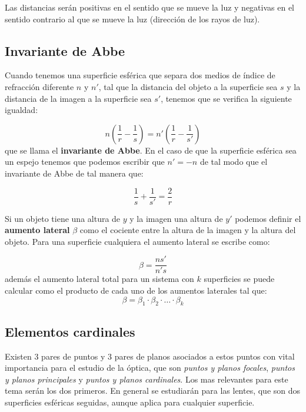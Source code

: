 \documentclass[12pt,a4paper]{article}
\newcommand{\parentesis}[1]{\left( #1  \right)}
\numberwithin{equation}{section}
\numberwithin{figure}{section}
\begin{document}
Las distancias serán positivas en el sentido que se mueve la luz y negativas en el sentido contrario al que se mueve la luz (dirección de los rayos de luz).

\subsection{Invariante de Abbe}

Cuando tenemos una superficie esférica que separa dos medios de índice de refracción diferente $n$ y $n'$, tal que la distancia del objeto a la superficie sea $s$ y la distancia de la imagen a la superficie sea $s'$, tenemos que se verifica la siguiente igualdad:

\begin{equation}
n \parentesis{\dfrac{1}{r}-\dfrac{1}{s}} = n' \parentesis{\dfrac{1}{r}-\dfrac{1}{s'}}
\end{equation}
que se llama el \textbf{invariante de Abbe}. En el caso de que la superficie esférica sea un espejo tenemos que podemos escribir que $n' = -n$ de tal modo que el invariante de Abbe de tal manera que:

\begin{equation}
\dfrac{1}{s} + \dfrac{1}{s'} = \dfrac{2}{r}
\end{equation} 

Si un objeto tiene una altura de $y$ y la imagen una altura de $y'$ podemos definir el \textbf{aumento lateral} $\beta$ como el cociente entre la altura de la imagen y la altura del objeto. Para una superficie cualquiera el aumento lateral se escribe como:

\begin{equation}
\beta = \dfrac{n s'}{n' s}
\end{equation}
además el aumento lateral total para un sistema con $k$ superficies se puede calcular como el producto de cada uno de los aumentos laterales tal que:
\begin{equation}
\beta = \beta_1 \cdot \beta_2 \cdot \ldots \cdot \beta_k
\end{equation}



\subsection{Elementos cardinales}

Existen 3 pares de puntos y 3 pares de planos asociados a estos puntos con vital importancia para el estudio de la óptica, que son \textit{puntos y planos focales}, \textit{puntos y planos principales} y \textit{puntos y planos cardinales}. Los mas relevantes para este tema serán los dos primeros. En general se estudiarán para las lentes, que son dos superficies esféricas seguidas, aunque aplica para cualquier superficie. \\
\end{document}
